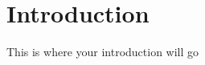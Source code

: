 \documentclass[./dissertation.tex]{subfiles}
\begin{document}
    \chapter{Introduction}
    This is where your introduction will go
\end{document}
